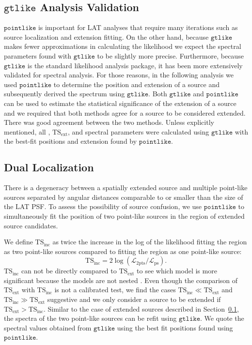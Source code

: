 \documentclass[12pt,preprint]{aastex}
\newcommand{\tsext}{{\ensuremath{\text{TS}_{\text{ext}}}}\xspace}
\newcommand{\tsinc}{\ensuremath{\text{TS}_{\text{inc}}}\xspace}
\newcommand{\likelihood}{\ensuremath{\mathcal{L}}\xspace}
\newcommand{\ts}{\text{TS}\xspace}
\newcommand{\gtlike}{\ensuremath{\mathtt{gtlike}}\xspace}
\newcommand{\pointlike}{\ensuremath{\mathtt{pointlike}}\xspace}
\begin{document}
\subsection{\gtlike Analysis Validation}
\label{gtlike_crosscheck}

\pointlike is important for LAT analyses that require many iterations
such as source localization and extension fitting.  On the other hand,
because \gtlike makes fewer approximations in calculating the likelihood
we expect the spectral parameters found with \gtlike to be slightly more
precise.  Furthermore, because \gtlike is the standard likelihood analysis
package, it has been more extensively validated for spectral analysis.
For those reasons, in the following analysis we used \pointlike to
determine the position and extension of a source and subsequently derived
the spectrum using \gtlike. Both \gtlike and \pointlike can be used to
estimate the statistical significance of the extension of a source and we
required that both methods agree for a source to be considered extended.
There was good agreement between the two methods.  Unless explicitly
mentioned, all \ts, \tsext, and spectral parameters were calculated using
\gtlike with the best-fit positions and extension found by \pointlike.

\subsection{Dual Localization}
\label{dual_localization_method}

There is a degeneracy between a spatially extended source and multiple
point-like  sources separated by angular distances comparable to or smaller than
the size of the LAT PSF.  To assess the possibility of source confusion,
we use \pointlike to simultaneously fit the position of two point-like sources
in the region of extended source candidates.

We define \tsinc as twice the increase in the log of the likelihood fitting the
region as two point-like sources compared to fitting the region as one point-like
source: 
\begin{equation}
  \tsinc=2\log(\likelihood_\text{2pts}/\likelihood_\text{ps}).
\end{equation} 
\tsinc can not be directly compared to \tsext to see which
model is more significant because the models are not nested
\citep{statistics_with_care}. Even though the comparison of \tsext with
\tsinc is not a calibrated test, we find the cases $\tsinc \ll \tsext$
and $\tsinc\gg\tsext$ suggestive and we only consider a source to be
extended if $\tsext>\tsinc$.
Similar to the case of extended sources described in Section~\ref{gtlike_crosscheck},
the spectra of the two point-like sources can be refit using \gtlike.
We quote the spectral values obtained from \gtlike using the best fit
positions found using \pointlike.  
\end{document}
